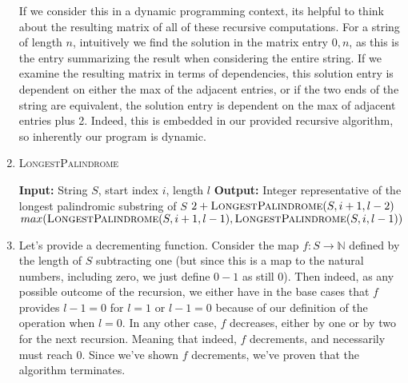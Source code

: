 \documentclass{article}
\begin{document}
\begin{enumerate}
		If we consider this in a dynamic programming context, its
		helpful to think about the resulting matrix of all
		of these recursive computations. For a string of length $n$,
		intuitively we find the solution in the matrix entry $0,n$,
		as this is the entry summarizing the result when considering
		the entire string. If we examine the resulting matrix in
		terms of dependencies, this solution entry is dependent on
		either the max of the adjacent entries, or if the two ends of
		the string are equivalent, the solution entry is dependent
		on the max of adjacent entries plus 2. Indeed, this is
		embedded in our provided recursive algorithm, so inherently
		our program is dynamic.
	\item 
		\begin{algorithm}
			\begin{algorithmic}
				\caption{\textsc{LongestPalindrome}}
				\State \textbf{Input:} String $S$, start index $i$, length $l$
				\State \textbf{Output:} Integer representative of the longest palindromic substring of $S$
				\State {}
				\EndIf
				\State {}
				\EndIf
				\State \Return $2 + \textsc{LongestPalindrome}(S,i + 1, l-2)$
				\Else
				\State \Return $max(\textsc{LongestPalindrome}(S,i + 1, l-1),\textsc{LongestPalindrome}(S,i, l-1))$
				\EndIf
			\end{algorithmic}
		\end{algorithm}

	\item Let's provide a decrementing function. Consider the map $f: S \rightarrow \mathbb{N}$ 
		defined by the length of $S$ subtracting one (but since this is a map to the natural numbers, including zero,
		we just define $0-1$ as still $0$). Then indeed, as any possible outcome of the recursion, we either have
		in the base cases that $f$ provides $l-1 = 0$ for $l=1$ or $l-1 = 0$ because of our definition of the operation
		when $l=0$. In any other case, $f$ decreases, either by one or by two for the next recursion. Meaning that indeed,
		$f$ decrements, and necessarily must reach $0$. Since we've shown $f$ decrements, we've proven that the algorithm
		terminates.
	

\end{enumerate}
\end{document}
